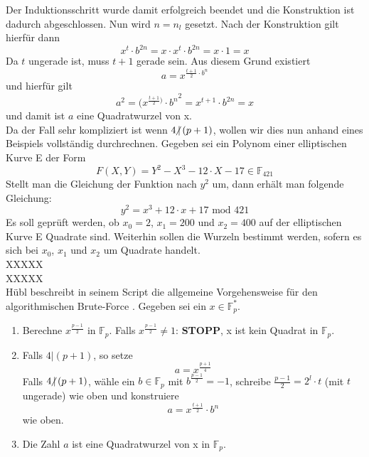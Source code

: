 Der Induktionsschritt wurde damit erfolgreich beendet und die Konstruktion ist dadurch abgeschlossen. Nun wird $n = n_l$ gesetzt. Nach der Konstruktion gilt hierfür dann $$x^t \cdot b^{2n} = x \cdot x^t \cdot b^{2n} = x \cdot 1 = x$$ Da $t$ ungerade ist, muss $t + 1$ gerade sein. Aus diesem Grund existiert $$a = x^{\frac{t + 1}{2} \cdot b^n}$$ und hierfür gilt $$a^2 = {(x^{\frac{t + 1}{2})} \cdot b^n}^2 = x^{t + 1} \cdot b^{2n} = x$$ und damit ist $a$ eine Quadratwurzel von x.\\

Da der Fall sehr kompliziert ist wenn $4 \hspace{-0.4em}\not\hspace{0.025em}|\, (p + 1)$, wollen wir dies nun anhand eines Beispiels vollständig durchrechnen. Gegeben sei ein Polynom einer elliptischen Kurve E der Form $$F(X, Y) = Y^{2} - X^{3} - 12 \cdot X - 17 \in \mathbb{F}_{421}$$ Stellt man die Gleichung der Funktion nach $y^{2}$ um, dann erhält man folgende Gleichung: $$y^{2} =  x^{3} + 12 \cdot x + 17 \text{ mod }421$$ Es soll geprüft werden, ob $x_0 = 2$, $x_1 = 200$ und $x_2 = 400$ auf der elliptischen Kurve E Quadrate sind. Weiterhin sollen die Wurzeln bestimmt werden, sofern es sich bei $x_0$, $x_1$ und $x_2$ um Quadrate handelt.\\

XXXXX\\

XXXXX\\





Hübl beschreibt in seinem Script die allgemeine Vorgehensweise für den algorithmischen Brute-Force \cite[S. 270-272]{Dr.ReinholdHubl.2022}. Gegeben sei ein $x \in \mathbb{F}_p^*$.

\begin{enumerate}
\item Berechne $x^{\frac{p - 1}{2}}$ in $\mathbb{F}_p$. Falls $x^{\frac{p - 1}{2}} \neq 1$: \textbf{STOPP}, x ist kein Quadrat in $\mathbb{F}_p$.
\item Falls $4 | (p + 1)$, so setze $$a =  x^{\frac{p + 1}{4}}$$ Falls $4 \hspace{-0.4em}\not\hspace{0.025em}|\, (p + 1)$, wähle ein $b \in \mathbb{F}_p$ mit $b^{\frac{p - 1}{2}} = -1$, schreibe $\frac{p - 1}{2} = 2^l \cdot t$ (mit $t$ ungerade) wie oben und konstruiere $$a =  x^{\frac{t + 1}{2}} \cdot b^n$$ wie oben.
\item Die Zahl $a$ ist eine Quadratwurzel von x in $\mathbb{F}_p$.
\end{enumerate}


